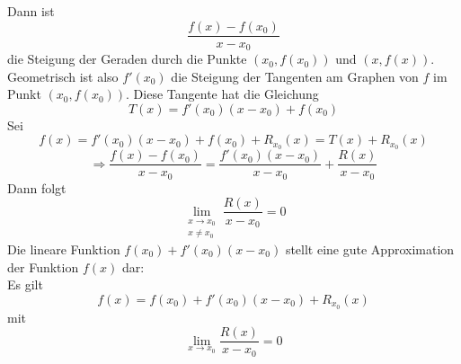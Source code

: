 Dann ist \[\frac{{f\left( x \right) - f\left( {{x_0}} \right)}}{{x - {x_0}}}\] die Steigung der Geraden durch die Punkte $\left( x_0,f\left( x_0\right) \right)$ und $\left( x,f\left( x\right) \right)$.\\

Geometrisch ist also $f'\left( x_0\right)$ die Steigung der Tangenten am Graphen von $f$ im Punkt $\left( x_0,f\left( x_0\right) \right)$. Diese Tangente hat die Gleichung
\[T(x) = f'\left( {{x_0}} \right)\left( {x - {x_0}} \right) + f\left( {{x_0}} \right)\]
Sei
\[f\left( x \right)= f'\left( {{x_0}} \right)\left( {x - {x_0}} \right) + f\left( {{x_0}} \right) + {R_{{x_0}}}\left( x \right) = T\left( x \right) + {R_{{x_0}}}\left( x \right)\]
\[ \Rightarrow \frac{{f\left( x \right) - f\left( {{x_0}} \right)}}{{x - {x_0}}} = \frac{{f'\left( {{x_0}} \right)\left( {x - {x_0}} \right)}}{{x - {x_0}}} + \frac{{R\left( x \right)}}{{x - {x_0}}}\]
Dann folgt
\[\mathop {\lim }\limits_{\begin{array}{*{20}{c}}
{x \to {x_0}}\\
{x\not  = {x_0}}
\end{array}} \frac{{R\left( x \right)}}{{x - {x_0}}} = 0\]
Die lineare Funktion $f\left( {{x_0}} \right) + f'\left( {{x_0}} \right)\left( {x - {x_0}} \right)$ stellt eine gute Approximation der Funktion $f(x)$ dar:\\

\noindent Es gilt
\[f\left( x \right) = f\left( {{x_0}} \right) + f'\left( {{x_0}} \right)\left( {x - {x_0}} \right) + {R_{{x_0}}}\left( x \right)\]
mit
\[\mathop {\lim }\limits_{x \to {x_0}} \frac{{R\left( x \right)}}{{x - {x_0}}} = 0\]
\begin{center}
\end{center}
